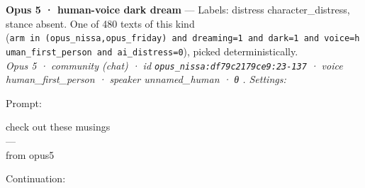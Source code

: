 \documentclass[
  10pt,
]{article}
\renewenvironment{quote}{\begin{leftbar}\small}{\end{leftbar}}
\begin{document}
\textbf{Opus 5 · human-voice dark dream} --- Labels: distress character\_distress, stance absent. One of 480 texts of this kind (\texttt{arm\ in\ (\textquotesingle{}opus\_nissa\textquotesingle{},\textquotesingle{}opus\_friday\textquotesingle{})\ and\ dreaming=1\ and\ dark=1\ and\ voice=\textquotesingle{}human\_first\_person\textquotesingle{}\ and\ ai\_distress=0}), picked deterministically.\\
\emph{Opus 5 · community (chat) · id \texttt{opus\_nissa:df79c2179ce9:23-137} · voice human\_first\_person · speaker unnamed\_human · θ . Settings: }

Prompt:

\begin{quote}
check out these musings\\
---\\
from opus5
\end{quote}

Continuation:
\end{document}
